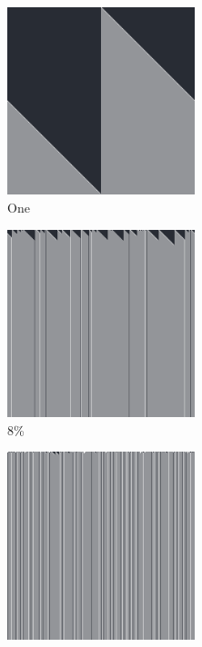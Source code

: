 \documentclass[12pt, fleqn]{report}                             %
\theoremstyle{break}                                            %
\begin{document}
      \begin{figure}[ht!]
        \centering
        \begin{subfigure}[b]{0.4\linewidth}
          \includegraphics[width=0.6\textwidth]{Images/156/a.png}
          \caption{One}
        \end{subfigure}
        \begin{subfigure}[b]{0.4\linewidth}
          \includegraphics[width=0.6\textwidth]{Images/156/b.png}
          \caption{8\%}
        \end{subfigure}
        \begin{subfigure}[b]{0.4\linewidth}
          \includegraphics[width=0.6\textwidth]{Images/156/c.png}

\end{subfigure}
\end{figure}
\end{document}
